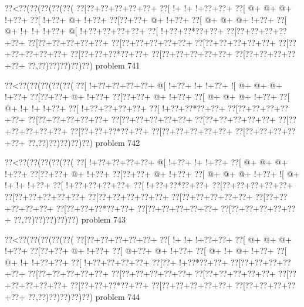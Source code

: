 \vbox{\vbox{\goo
\0??<\0??(\0??(\0??(\0??(\0??(
\0??[\0??+\0??+\0??+\0??+\0??+
\0??[\- !+\- !+\- !+\0??+\0??+
\0??[\- @+\- @+\- @+\- !+\0??+
\0??[\- !+\0??+\- @+\- !+\0??+
\0??[\0??+\0??+\- @+\- !+\0??+
\0??[\- @+\- @+\- @+\- !+\0??+
\0??[\- @+\- !+\- !+\- !+\0??+
\- @[\- !+\0??+\0??+\0??+\0??+
\0??[\- !+\0??+\0??*\0??+\0??+
\0??[\0??+\0??+\0??+\0??+\0??+
\0??[\0??+\0??+\0??+\0??+\0??+
\0??[\0??+\0??+\0??+\0??+\0??+
\0??[\0??+\0??+\0??+\0??+\0??+
\0??[\0??+\0??+\0??+\0??+\0??+
\0??[\0??+\0??+\0??*\0??+\0??+
\0??[\0??+\0??+\0??+\0??+\0??+
\0??[\0??+\0??+\0??+\0??+\0??+
\0??,\0??)\0??)\0??)\0??)\0??)
}
\hfil problem 741\hfil\break
}

\vbox{\vbox{\goo
\0??<\0??(\0??(\0??(\0??(\0??(
\0??[\- !+\0??+\0??+\0??+\0??+
\- @[\- !+\0??+\- !+\- !+\0??+
\- ![\- @+\- @+\- @+\- !+\0??+
\0??[\0??+\0??+\- @+\- !+\0??+
\0??[\0??+\0??+\- @+\- !+\0??+
\0??[\- @+\- @+\- @+\- !+\0??+
\0??[\- @+\- !+\- !+\- !+\0??+
\0??[\- !+\0??+\0??+\0??+\0??+
\0??[\- !+\0??+\0??*\0??+\0??+
\0??[\0??+\0??+\0??+\0??+\0??+
\0??[\0??+\0??+\0??+\0??+\0??+
\0??[\0??+\0??+\0??+\0??+\0??+
\0??[\0??+\0??+\0??+\0??+\0??+
\0??[\0??+\0??+\0??+\0??+\0??+
\0??[\0??+\0??+\0??*\0??+\0??+
\0??[\0??+\0??+\0??+\0??+\0??+
\0??[\0??+\0??+\0??+\0??+\0??+
\0??,\0??)\0??)\0??)\0??)\0??)
}
\hfil problem 742\hfil\break
}

\vbox{\vbox{\goo
\0??<\0??(\0??(\0??(\0??(\0??(
\0??[\- !+\0??+\0??+\0??+\0??+
\- @[\- !+\0??+\- !+\- !+\0??+
\0??[\- @+\- @+\- @+\- !+\0??+
\0??[\0??+\0??+\- @+\- !+\0??+
\0??[\0??+\0??+\- @+\- !+\0??+
\0??[\- @+\- @+\- @+\- !+\0??+
\- ![\- @+\- !+\- !+\- !+\0??+
\0??[\- !+\0??+\0??+\0??+\0??+
\0??[\- !+\0??+\0??*\0??+\0??+
\0??[\0??+\0??+\0??+\0??+\0??+
\0??[\0??+\0??+\0??+\0??+\0??+
\0??[\0??+\0??+\0??+\0??+\0??+
\0??[\0??+\0??+\0??+\0??+\0??+
\0??[\0??+\0??+\0??+\0??+\0??+
\0??[\0??+\0??+\0??*\0??+\0??+
\0??[\0??+\0??+\0??+\0??+\0??+
\0??[\0??+\0??+\0??+\0??+\0??+
\0??,\0??)\0??)\0??)\0??)\0??)
}
\hfil problem 743\hfil\break
}

\vbox{\vbox{\goo
\0??<\0??(\0??(\0??(\0??(\0??(
\0??[\0??+\0??+\0??+\0??+\0??+
\0??[\- !+\- !+\- !+\0??+\0??+
\0??[\- @+\- @+\- @+\- !+\0??+
\0??[\0??+\0??+\- @+\- !+\0??+
\0??[\- @+\0??+\- @+\- !+\0??+
\0??[\- @+\- !+\- @+\- !+\0??+
\0??[\- @+\- !+\- !+\0??+\0??+
\0??[\- !+\0??+\0??+\0??+\0??+
\0??[\0??+\- !+\0??*\0??+\0??+
\0??[\0??+\0??+\0??+\0??+\0??+
\0??[\0??+\0??+\0??+\0??+\0??+
\0??[\0??+\0??+\0??+\0??+\0??+
\0??[\0??+\0??+\0??+\0??+\0??+
\0??[\0??+\0??+\0??+\0??+\0??+
\0??[\0??+\0??+\0??*\0??+\0??+
\0??[\0??+\0??+\0??+\0??+\0??+
\0??[\0??+\0??+\0??+\0??+\0??+
\0??,\0??)\0??)\0??)\0??)\0??)
}
\hfil problem 744\hfil\break
}

